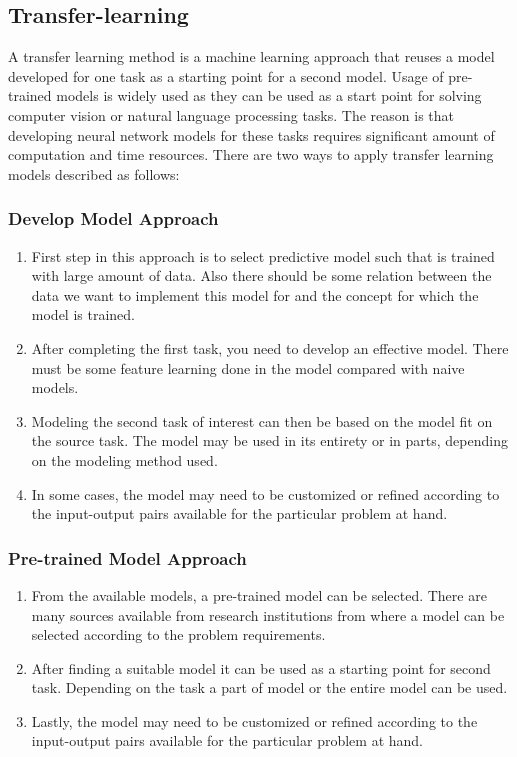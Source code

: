     \subsection{Transfer-learning}
    A transfer learning method is a machine learning approach that reuses a model developed for one task as a starting point for a second model. Usage of pre-trained models is widely used as they can be used as a start point for solving computer vision or natural language processing tasks. The reason is that developing neural network models for these tasks requires significant amount of computation and time resources. There are two ways to apply transfer learning models described as follows:
    
    \subsubsection{Develop Model Approach}
    \begin{enumerate}
    	\item First step in this approach is to select predictive model such that is trained with large amount of data. Also there should be some relation between the data we want to implement this model for and the concept for which the model is trained.
    	\item After completing the first task, you need to develop an effective model. There must be some feature learning done in the model compared with naive models.
    	\item Modeling the second task of interest can then be based on the model fit on the source task. The model may be used in its entirety or in parts, depending on the modeling method used.
    	\item  In some cases, the model may need to be customized or refined according to the input-output pairs available for the particular problem at hand.
    \end{enumerate}
    \subsubsection{Pre-trained Model Approach}
     \begin{enumerate}
     	\item From the available models, a pre-trained model can be selected. There are many sources available from research institutions from where a model can be selected according to the problem requirements.
     	\item After finding a suitable model it can be used as a starting point for second task. Depending on the task a part of model or the entire model can be used.
     
     	\item  Lastly, the model may need to be customized or refined according to the input-output pairs available for the particular problem at hand.
     \end{enumerate}
    
